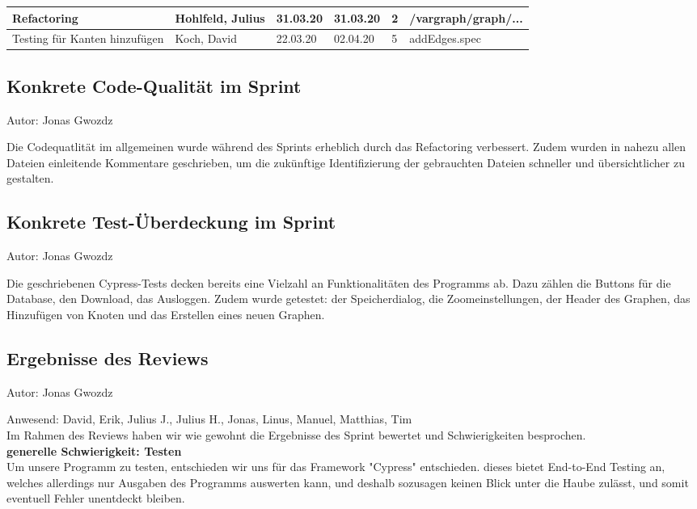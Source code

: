 \begin{itemize}
\begin{longtable}{|p{4cm}|p{2cm}|p{1.2cm}|p{1.2cm}|p{0.7cm}|p{3.8cm}|}
  Refactoring                                                           & Hohlfeld, Julius      & 31.03.20 & 31.03.20 & 2     & /vargraph/graph/...                     \\ \hline
  Testing für Kanten hinzufügen                                         & Koch, David           & 22.03.20 & 02.04.20 & 5     & addEdges.spec      \\ \hline
\end{longtable}

\subsection{Konkrete Code-Qualität im Sprint}
{\small Autor: Jonas Gwozdz}

Die Codequatlität im allgemeinen wurde während des Sprints erheblich durch das Refactoring verbessert. Zudem wurden in nahezu  allen Dateien einleitende Kommentare geschrieben, um die zukünftige Identifizierung der gebrauchten Dateien schneller und übersichtlicher zu gestalten.

\subsection{Konkrete Test-Überdeckung im Sprint}
{\small Autor: Jonas Gwozdz}

Die geschriebenen Cypress-Tests decken bereits eine Vielzahl an Funktionalitäten des Programms ab. Dazu zählen die Buttons für die Database, den Download, das Ausloggen. Zudem wurde getestet: der Speicherdialog, die Zoomeinstellungen, der Header des Graphen, das Hinzufügen von Knoten und das Erstellen eines neuen Graphen.

\subsection{Ergebnisse des Reviews}
{\small Autor: Jonas Gwozdz}

Anwesend: David, Erik, Julius J., Julius H., Jonas, Linus, Manuel, Matthias, Tim\\

Im Rahmen des Reviews haben wir wie gewohnt die Ergebnisse des Sprint bewertet und Schwierigkeiten besprochen.\\

\textbf{generelle Schwierigkeit: Testen}\\
Um unsere Programm zu testen, entschieden wir uns für das Framework "Cypress" entschieden. dieses bietet End-to-End Testing an, welches allerdings nur Ausgaben des Programms auswerten kann, und deshalb sozusagen keinen Blick unter die Haube zulässt, und somit eventuell Fehler unentdeckt bleiben. \\


\end{itemize}

